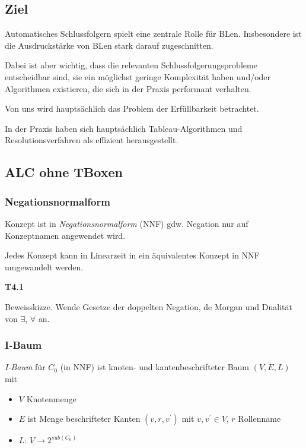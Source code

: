 \subsection{Ziel}

Automatisches Schlussfolgern spielt eine zentrale Rolle für BLen. Insbesondere ist die Ausdruckstärke von BLen stark darauf zugeschnitten.

Dabei ist aber wichtig, dass die relevanten Schlussfolgerungsprobleme entscheidbar sind, sie ein möglichst geringe Komplexität haben und/oder Algorithmen existieren, die sich in der Praxis performant verhalten.

Von uns wird hauptsächlich das Problem der Erfüllbarkeit betrachtet.

In der Praxis haben sich hauptsächlich Tableau-Algorithmen und Resolutionsverfahren als effizient herausgestellt.

\subsection{ALC ohne TBoxen}\label{alc-ohne-tboxen}

\subsubsection{Negationsnormalform}\label{negationsnormalform}

\begin{definition}[Negationsnormalform]

Konzept ist in \emph{Negationsnormalform} (NNF) gdw. Negation nur auf
Konzeptnamen angewendet wird.
\end{definition}

\begin{lemma}
Jedes Konzept kann in Linearzeit in ein äquivalentes Konzept in NNF
umgewandelt werden.
\end{lemma}

\textbf{T4.1}

Beweisskizze. Wende Gesetze der doppelten Negation, de Morgan und
Dualität von $\exists$, $\forall$ an.

\subsubsection{I-Baum}\label{i-baum}

\begin{definition}[I-Baum]

\emph{I-Baum} für $C_{0}$ (in NNF) ist knoten- und kantenbeschrifteter
Baum $\left( V,E,L \right)$ mit

\begin{itemize}
\item
  $V$ Knotenmenge
\item
  $E$ ist Menge beschrifteter Kanten $\left( v,r,v^{'} \right)$ mit
  $v$,$\ v^{'} \in V$, $r$ Rollenname
\item
  $L$: $V \rightarrow 2^{sub(C_{0})}$
\end{itemize}
\end{definition}

